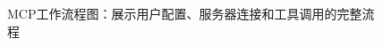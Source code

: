 \begin{figure}[H]
  \centering
  \caption{MCP工作流程图：展示用户配置、服务器连接和工具调用的完整流程}
  \label{fig:mcp_workflow}
\end{figure}


